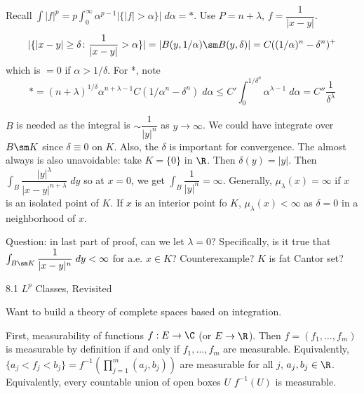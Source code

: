 Recall $\int |f|^p= p \int_0^\infty \alpha^{p-1} |\{|f|>\alpha\}| \; d \alpha= *$. Use $P= n + \lambda$, $f=\dfrac{1}{|x-y|}$.
	\[
	| \{ |x-y| \geq \delta \colon \dfrac{1}{|x-y|}>\alpha\}| = |B(y,1/\alpha) \sm B(y,\delta)|= C((1/\alpha)^n - \delta^n)^+
	\]
which is $=0$ if $\alpha>1/\delta$. For *, note
	\[
	*= (n+\lambda)^{1/\delta} \alpha^{n+\lambda-1} C (1/\alpha^n - \delta^n) \; d\alpha \leq C' \int_0^{1/\delta^n} \alpha^{\lambda-1} \; d \alpha = C'' \dfrac{1}{\delta^\lambda}
	\]





$B$ is needed as the integral is $\sim \dfrac{1}{|y|^n}$ as $y \to \infty$. We could have integrate over $B \sm K$ since $\delta \equiv 0$ on $K$. Also, the $\delta$ is important for convergence. The almost always is also unavoidable: take $K=\{0\}$ in $\R$. Then $\delta(y)= |y|$. Then $\int_B \dfrac{|y|^\lambda}{|x-y|^{n+\lambda}} \; dy$ so at $x=0$, we get $\int_B \dfrac{1}{|y|^n}= \infty$. Generally, $\mu_\lambda(x)= \infty$ if $x$ is an isolated point of $K$. If $x$ is an interior point fo $K$, $\mu_\lambda(x)< \infty$ as $\delta=0$ in a neighborhood of $x$.




Question: in last part of proof, can we let $\lambda=0$? Specifically, is it true that $\int_{B \sm K} \dfrac{1}{|x-y|^n} \; dy< \infty$ for a.e. $x \in K$? Counterexample? $K$ is fat Cantor set?







8.1 $L^p$ Classes, Revisited

Want to build a theory of complete spaces based on integration. 




First, measurability of functions $f: E \to \C$ (or $E \to \R$). Then $f=(f_1,\ldots,f_m)$ is measurable by definition if and only if $f_1,\ldots,f_m$ are measurable. Equivalently, $\{a_j<f_j<b_j\}= f^{-1}(\prod_{j=1}^m (a_j,b_j))$ are measurable for all $j$, $a_j,b_j \in \R$. Equivalently, every countable union of open boxes $U$ $f^{-1}(U)$ is measurable. 


